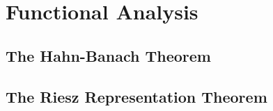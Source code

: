 \newpage
\section{Functional Analysis}

\subsection{The Hahn-Banach Theorem}


\subsection{The Riesz Representation Theorem}

